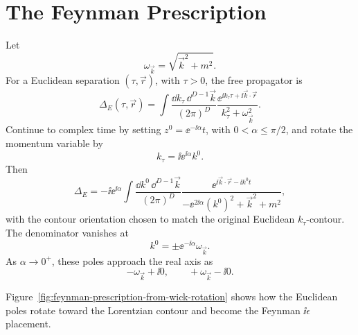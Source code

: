 \section{The Feynman Prescription}

\begin{definition}
\label{def:wick-rotated-free-propagator-poles}
Let
\[
  \omega_{\vec k}=\sqrt{\vec k^2+m^2}.
\]
For a Euclidean separation \((\tau,\vec r)\), with \(\tau>0\), the free
propagator is
\[
  \Delta_E(\tau,\vec r)
  =
  \int\frac{\dd k_\tau\,\dd^{D-1}\vec k}{(2\pi)^D}
  \frac{\ee^{\ii k_\tau\tau+\ii\vec k\cdot\vec r}}
       {k_\tau^2+\omega_{\vec k}^2}.
\]
Continue to complex time by setting \(z^0=\ee^{-\ii\alpha}t\), with
\(0<\alpha\le\pi/2\), and rotate the momentum variable by
\[
  k_\tau=\ii\ee^{\ii\alpha}k^0.
\]
Then
\[
  \Delta_E
  =
  -\ii\ee^{\ii\alpha}
  \int\frac{\dd k^0\,\dd^{D-1}\vec k}{(2\pi)^D}
  \frac{
    \ee^{\ii\vec k\cdot\vec r-\ii k^0t}
  }{
    -\ee^{2\ii\alpha}(k^0)^2+\vec k^2+m^2
  },
\]
with the contour orientation chosen to match the original Euclidean
\(k_\tau\)-contour. The denominator vanishes at
\[
  k^0=\pm \ee^{-\ii\alpha}\omega_{\vec k}.
\]
As \(\alpha\to0^+\), these poles approach the real axis as
\[
  -\omega_{\vec k}+\ii0,
  \qquad
  +\omega_{\vec k}-\ii0.
\]
\end{definition}

Figure~\ref{fig:feynman-prescription-from-wick-rotation} shows how the Euclidean
poles rotate toward the Lorentzian contour and become the Feynman
\(\ii\epsilon\) placement.

